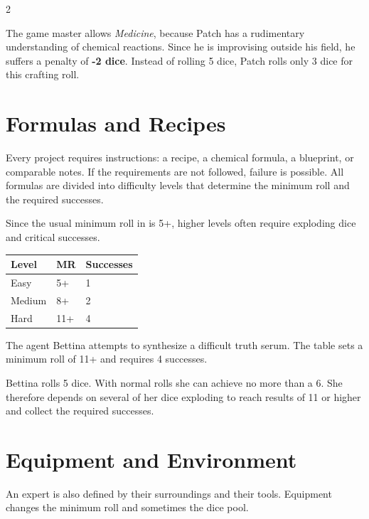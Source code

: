 \begin{multicols}{2}
\begin{pexample}[Example]
The game master allows \textit{Medicine}, because Patch has a rudimentary understanding of chemical reactions. Since he is improvising outside his field, he suffers a penalty of \textbf{-2 dice}. Instead of rolling 5 dice, Patch rolls only 3 dice for this crafting roll.
\end{pexample}

\section{Formulas and Recipes}

Every project requires instructions: a recipe, a chemical formula, a blueprint, or comparable notes. If the requirements are not followed, failure is possible. All formulas are divided into difficulty levels that determine the minimum roll and the required successes.

Since the usual minimum roll in  is 5+, higher levels often require exploding dice and critical successes.

\begin{center}
\begin{tabular}{@{}lll@{}}
\toprule
\textbf{Level} & \textbf{MR} & \textbf{Successes}\\
\midrule
Easy & 5+ & 1\\
Medium & 8+ & 2\\
Hard & 11+ & 4\\
\bottomrule
\end{tabular}
\end{center}

\begin{pexample}[Example]
The agent Bettina attempts to synthesize a difficult truth serum. The table sets a minimum roll of 11+ and requires 4 successes.

Bettina rolls 5 dice. With normal rolls she can achieve no more than a 6. She therefore depends on several of her dice exploding to reach results of 11 or higher and collect the required successes.
\end{pexample}

\section{Equipment and Environment}

An expert is also defined by their surroundings and their tools. Equipment changes the minimum roll and sometimes the dice pool.


\end{multicols}
